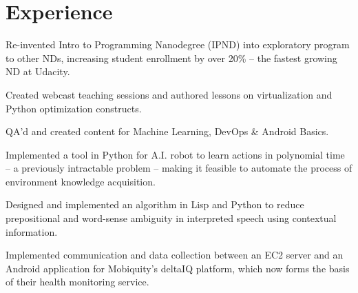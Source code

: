 \documentclass[]{deedy-resume-openfont}
\begin{document}
\begin{minipage}[t]{0.66\textwidth} 


\section{Experience}

\vspace{\topsep} %
\begin{tightemize}

\item Re-invented Intro to Programming Nanodegree (IPND) into exploratory program to other NDs, increasing student enrollment by over 20\% -- the fastest growing ND at Udacity.

\item Created webcast teaching sessions and authored lessons on virtualization and Python optimization constructs.

\item QA'd and created content for Machine Learning, DevOps \& Android Basics.

\end{tightemize}
\sectionsep

\begin{tightemize}
\item Implemented a tool in Python for A.I. robot to learn actions in polynomial time -- a previously intractable problem -- making it feasible to automate the process of environment knowledge acquisition.

\item Designed and implemented an algorithm in Lisp and Python to reduce prepositional and word-sense ambiguity in interpreted speech using contextual information.
\end{tightemize}
\sectionsep

\begin{tightemize}
\item Implemented communication and data collection between an EC2 server and an Android application for Mobiquity’s deltaIQ platform, which now forms the basis of their health monitoring service.


\end{tightemize}
\end{minipage}
\end{document}

